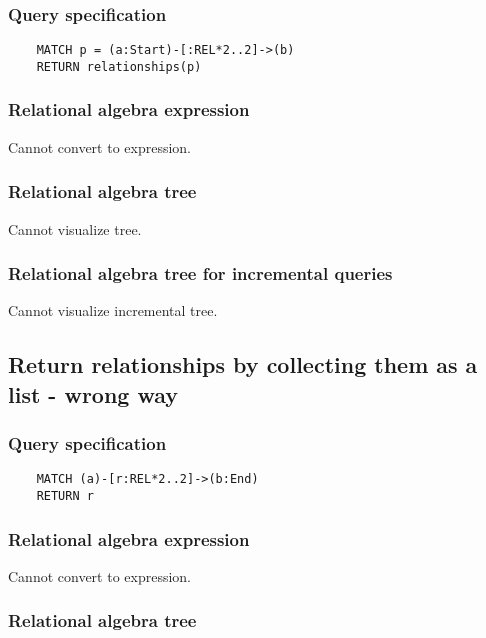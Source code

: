 	\subsubsection*{Query specification}

	\begin{lstlisting}
	MATCH p = (a:Start)-[:REL*2..2]->(b)
	RETURN relationships(p)
	\end{lstlisting}


	\subsubsection*{Relational algebra expression}

	Cannot convert to expression.

	\subsubsection*{Relational algebra tree}

	Cannot visualize tree.

	\subsubsection*{Relational algebra tree for incremental queries}

	Cannot visualize incremental tree.
	\subsection{Return relationships by collecting them as a list - wrong way}

	\subsubsection*{Query specification}

	\begin{lstlisting}
	MATCH (a)-[r:REL*2..2]->(b:End)
	RETURN r
	\end{lstlisting}


	\subsubsection*{Relational algebra expression}

	Cannot convert to expression.

	\subsubsection*{Relational algebra tree}

